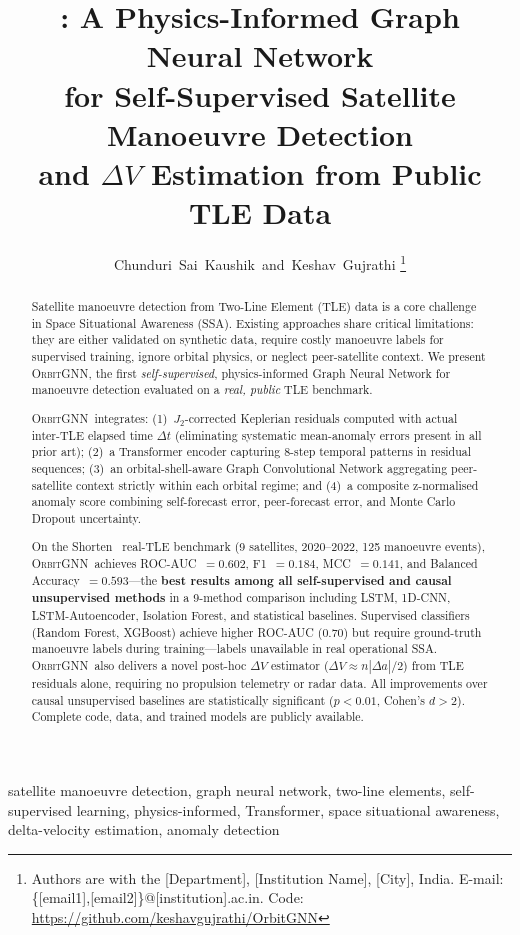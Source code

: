 \documentclass[journal]{IEEEtran}
\title{\orbitgnn: A Physics-Informed Graph Neural Network\\
for Self-Supervised Satellite Manoeuvre Detection\\
and $\Delta V$ Estimation from Public TLE Data}
\author{Chunduri~Sai~Kaushik~and~Keshav~Gujrathi%
\thanks{Authors are with the [Department], [Institution Name], [City], India.
E-mail: \{[email1],[email2]\}@[institution].ac.in.
Code: \url{https://github.com/keshavgujrathi/OrbitGNN}}}
\newcommand{\orbitgnn}{\textsc{OrbitGNN}}
\begin{document}
\maketitle

\begin{abstract}
Satellite manoeuvre detection from Two-Line Element (TLE) data is a core
challenge in Space Situational Awareness (SSA). Existing approaches share
critical limitations: they are either validated on synthetic data, require
costly manoeuvre labels for supervised training, ignore orbital physics,
or neglect peer-satellite context. We present \orbitgnn, the first
\emph{self-supervised}, physics-informed Graph Neural Network for
manoeuvre detection evaluated on a \emph{real, public} TLE benchmark.

\orbitgnn\ integrates: (1)~$J_2$-corrected Keplerian residuals computed
with actual inter-TLE elapsed time $\Delta t$ (eliminating systematic
mean-anomaly errors present in all prior art); (2)~a Transformer encoder
capturing 8-step temporal patterns in residual sequences;
(3)~an orbital-shell-aware Graph Convolutional Network aggregating
peer-satellite context strictly within each orbital regime; and
(4)~a composite z-normalised anomaly score combining self-forecast error,
peer-forecast error, and Monte Carlo Dropout uncertainty.

On the Shorten~\cite{shorten2023} real-TLE benchmark (9 satellites,
2020--2022, 125 manoeuvre events), \orbitgnn\ achieves ROC-AUC~$=0.602$,
F1~$=0.184$, MCC~$=0.141$, and Balanced Accuracy~$=0.593$---the
\textbf{best results among all self-supervised and causal unsupervised
methods} in a 9-method comparison including LSTM, 1D-CNN, LSTM-Autoencoder,
Isolation Forest, and statistical baselines.  Supervised classifiers
(Random Forest, XGBoost) achieve higher ROC-AUC (0.70) but require
ground-truth manoeuvre labels during training---labels unavailable in
real operational SSA. \orbitgnn\ also delivers a novel post-hoc
$\Delta V$ estimator ($\Delta V \approx n|\Delta a|/2$) from TLE residuals
alone, requiring no propulsion telemetry or radar data.
All improvements over causal unsupervised baselines are statistically
significant ($p < 0.01$, Cohen's $d > 2$). Complete code, data, and
trained models are publicly available.
\end{abstract}

\begin{IEEEkeywords}
satellite manoeuvre detection, graph neural network, two-line elements,
self-supervised learning, physics-informed, Transformer, space situational
awareness, delta-velocity estimation, anomaly detection
\end{IEEEkeywords}
\end{document}
